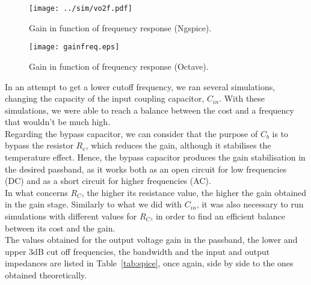 \vspace{-25mm}

\noindent
\begin{minipage}[c]{0.5\linewidth}

\begin{figure}[H] \centering
\texttt{[image: ../sim/vo2f.pdf]}
\caption{Gain in function of frequency response (Ngspice).}
\label{fig:sim}
\end{figure}

\end{minipage}
\begin{minipage}[c]{0.5\linewidth}

\vspace{16mm}

\begin{figure}[H] \centering
\texttt{[image: gainfreq.eps]}
\caption{Gain in function of frequency response (Octave).}
\label{fig:octave}
\end{figure}

\end{minipage}

\vspace{10mm}

In an attempt to get a lower cutoff frequency, we ran several simulations, changing the capacity of the input coupling capacitor, $C_{in}$. With these simulations, we were able to reach a balance between the cost and a frequency that wouldn't be much high.\\

Regarding the bypass capacitor, we can consider that the purpose of $C_b$ is to bypass the resistor $R_e$, which reduces the gain, although it stabilises the temperature effect. Hence, the bypass capacitor produces the gain stabilisation in the desired passband, as it works both as an open circuit for low frequencies (DC) and as a short circuit for higher frequencies (AC).\\

In what concerns $R_C$, the higher its resistance value, the higher the gain obtained in the gain stage. Similarly to what we did with $C_{in}$, it was also necessary to run simulations with different values for $R_C$, in order to find an efficient balance between its cost and the gain. \\

The values obtained for the output voltage gain in the passband, the lower and upper 3dB cut off frequencies, the bandwidth and the input and output impedances are listed in Table~\ref{tab:spice}, once again, side by side to the ones obtained theoretically.

